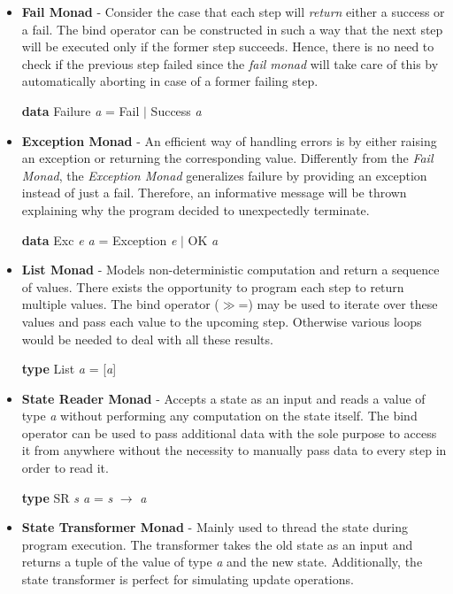 \documentclass[a4paper, onecolumn]{article}
\begin{document}
    \begin{itemize}
        \item \textbf{Fail Monad} - Consider the case that each step will \textit{return} either a success or a fail. The bind operator can be constructed in such a way that the next step will be executed only if the former step succeeds. Hence, there is no need to check if the previous step failed since the \textit{fail monad} will take care of this by automatically aborting in case of a former failing step.
        \begin{center}
            \textbf{data} Failure \textit{a} = Fail $\vert$ Success \textit{a} 
        \end{center}
        \item \textbf{Exception Monad} - An efficient way of handling errors is by either raising an exception or returning the corresponding value. Differently from the \textit{Fail Monad}, the \textit{Exception Monad} generalizes failure by providing an exception instead of just a fail. Therefore, an informative message will be thrown explaining why the program decided to unexpectedly terminate. 
        \begin{center}
            \textbf{data} Exc \textit{e a} = Exception \textit{e} $\vert$ OK \textit{a}
        \end{center}
        \item \textbf{List Monad} - Models non-deterministic computation and return a sequence of values. There exists the opportunity to program each step to return multiple values. The bind operator ($\gg$=) may be used to iterate over these values and pass each value to the upcoming step. Otherwise various loops would be needed to deal with all these results.
        \begin{center}
            \textbf{type} List \textit{a} = [\textit{a}]
        \end{center}
        \item \textbf{State Reader Monad} - Accepts a state as an input and reads a value of type \textit{a} without performing any computation on the state itself. The bind operator can be used to pass additional data with the sole purpose to access it from anywhere without the necessity to manually pass data to every step in order to read it. 
        \begin{center}
            \textbf{type} SR \textit{s a} = \textit{s} $\rightarrow$ \textit{a}
        \end{center}
        \item \textbf{State Transformer Monad} - Mainly used to thread the state during program execution. The transformer takes the old state as an input and returns a tuple of the value of type \textit{a} and the new state. Additionally, the state transformer is perfect for simulating update operations.

\end{itemize}
\end{document}
